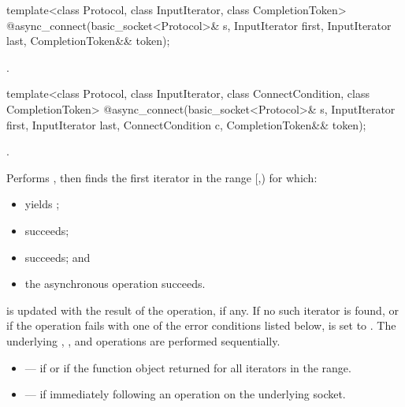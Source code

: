 \begin{itemdecl}
template<class Protocol, class InputIterator, class CompletionToken>
  @\DEDUCED@ async_connect(basic_socket<Protocol>& s,
                        InputIterator first, InputIterator last,
                        CompletionToken&& token);
\end{itemdecl}

\begin{itemdescr}
\pnum
\returns {}.
\end{itemdescr}

\begin{itemdecl}
template<class Protocol, class InputIterator,
  class ConnectCondition, class CompletionToken>
    @\DEDUCED@ async_connect(basic_socket<Protocol>& s,
                          InputIterator first, InputIterator last,
                          ConnectCondition c,
                          CompletionToken&& token);
\end{itemdecl}

\begin{itemdescr}
\pnum
\completionsig {}.

\pnum
\effects Performs , then finds the first iterator  in the range [,) for which:
\begin{itemize}
\item
{} yields ;
\item
{} succeeds;
\item
{} succeeds; and
\item
 the asynchronous operation succeeds.
\end{itemize}
\pnum
{} is updated with the result of the  operation, if any. If no such iterator is found, or if the operation fails with one of the error conditions listed below,  is set to . \enternote The underlying , , and  operations are performed sequentially. \exitnote

\pnum
\errors
\begin{itemize}
\item
{} --- if  or if the function object  returned  for all iterators in the range.
\item
{} --- if  immediately following an  operation on the underlying socket.
\end{itemize}
\end{itemdescr}



